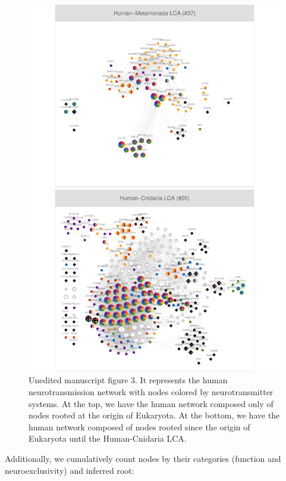 \begin{figure}

{\centering \includegraphics{figs/analysis.network.fig3-1} 

}

\caption{Unedited manuscript figure 3. It represents the human neurotransmission network with nodes colored by neurotransmitter systems. At the top, we have the human network composed only of nodes rooted at the origin of Eukaryota. At the bottom, we have the human network composed of nodes rooted since the origin of Eukaryota until the Human-Cnidaria LCA.}\label{fig:fig3}
\end{figure}

Additionally, we cumulatively count nodes by their categories (function
and neuroexclusivity) and inferred root:

